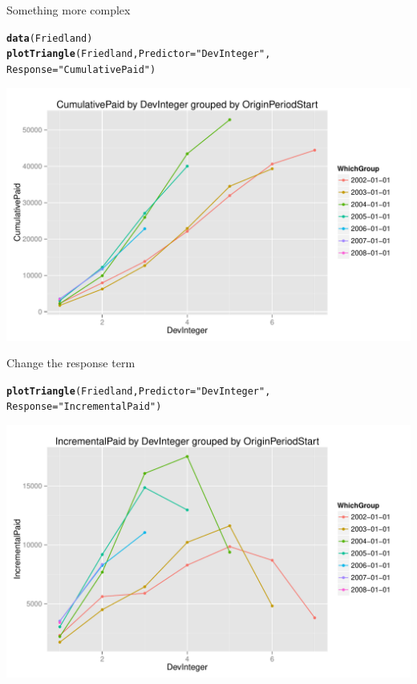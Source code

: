 \documentclass[xcolor=dvipsnames]{beamer}\usepackage{graphicx, color}
\makeatletter
\def\maxwidth{ %
  \ifdim\Gin@nat@width>\linewidth
    \linewidth
  \else
    \Gin@nat@width
  \fi
}
\newcommand{\hlfunctioncall}[1]{\textcolor[rgb]{0.501960784313725,0,0.329411764705882}{\textbf{#1}}}%
\newcommand{\hlstring}[1]{\textcolor[rgb]{0.6,0.6,1}{#1}}%
\newenvironment{kframe}{%
 \def\at@end@of@kframe{}%
 \ifinner\ifhmode%
  \def\at@end@of@kframe{\end{minipage}}%
  \begin{minipage}{\columnwidth}%
 \fi\fi%
 \def\FrameCommand##1{\hskip\@totalleftmargin \hskip-\fboxsep
 \colorbox{shadecolor}{##1}\hskip-\fboxsep
     \hskip-\linewidth \hskip-\@totalleftmargin \hskip\columnwidth}%
 \MakeFramed {\advance\hsize-\width
   \@totalleftmargin\z@ \linewidth\hsize
   \@setminipage}}%
 {\par\unskip\endMakeFramed%
 \at@end@of@kframe}
\newenvironment{knitrout}{}{} %
\makeatother
\begin{document}
\begin{frame}[fragile]{Something more complex}
\begin{knitrout}
\color{fgcolor}\begin{kframe}
\begin{alltt}
\hlfunctioncall{data}(Friedland)
\hlfunctioncall{plotTriangle}(Friedland, Predictor = \hlstring{"DevInteger"}, 
    Response = \hlstring{"CumulativePaid"})
\end{alltt}
\end{kframe}
\includegraphics[width=\maxwidth]{figure/Friedland1} 

\end{knitrout}

\end{frame}

\begin{frame}[fragile]{Change the response term}
\begin{knitrout}
\color{fgcolor}\begin{kframe}
\begin{alltt}
\hlfunctioncall{plotTriangle}(Friedland, Predictor = \hlstring{"DevInteger"}, 
    Response = \hlstring{"IncrementalPaid"})
\end{alltt}
\end{kframe}
\includegraphics[width=\maxwidth]{figure/Friedland2} 

\end{knitrout}

\end{frame}
\end{document}
